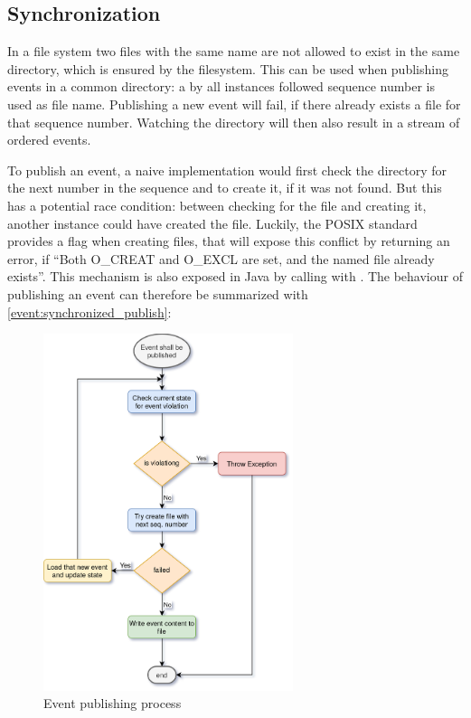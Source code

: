 \subsection{Synchronization}

In a file system two files with the same name are not allowed to exist in the same directory, which is ensured by the filesystem.
This can be used when publishing events in a common directory: a by all instances followed sequence number is used as file name.
Publishing a new event will fail, if there already exists a file for that sequence number.
Watching the directory will then also result in a stream of ordered events.

To publish an event, a naive implementation would first check the directory for the next number in the sequence and to create it, if it was not found.
But this has a potential race condition: between checking for the file and creating it, another instance could have created the file.
Luckily, the POSIX standard provides a flag when creating files, that will expose this conflict by returning an error, if \enquote{Both O\_CREAT and O\_EXCL are set, and the named file already exists}\cite{gnu:open}.
This mechanism is also exposed in Java by calling \cite{javadoc:files:write} with \cite{javadoc:standard_open_options:create_new}.
The behaviour of publishing an event can therefore be summarized with \autoref{event:synchronized_publish}:

\begin{figure}[H]
	\centering
	\includegraphics[width=0.65\textwidth]{event_publishing.png}
	\caption{Event publishing process}
	\label{event:synchronized_publish}
\end{figure}

